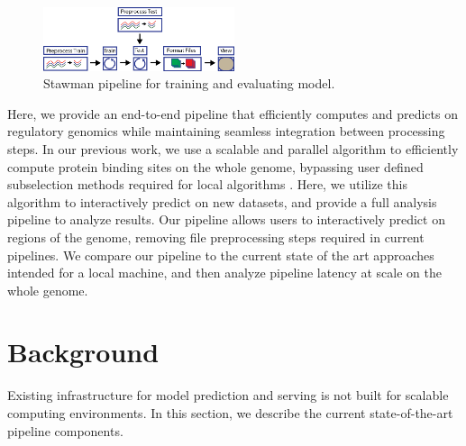 \documentclass{sig-alternate-05-2015}
\begin{document}
\begin{figure}
  \label{fig:strawmanPipeline}
  \includegraphics[width=0.5\textwidth]{figures/strawman.png}
  \caption{Stawman pipeline for training and evaluating model.}
\end{figure}

Here, we provide an end-to-end pipeline that efficiently computes and predicts on regulatory genomics while maintaining seamless integration between processing steps. In our previous work, we use a scalable and parallel algorithm to efficiently compute protein binding sites on the whole genome, bypassing user defined subselection methods required for local algorithms \cite{tfbinding}. Here, we utilize this algorithm to interactively predict on new datasets, and provide a full analysis pipeline to analyze results. Our pipeline allows users to interactively predict on regions of the genome, removing file preprocessing steps required in current pipelines. We compare our pipeline to the current state of the art approaches intended for a local machine, and then analyze pipeline latency at scale on the whole genome.

\section{Background}
Existing infrastructure for model prediction and serving is not built for scalable computing environments. In this section, we describe the current state-of-the-art pipeline components.
\end{document}
